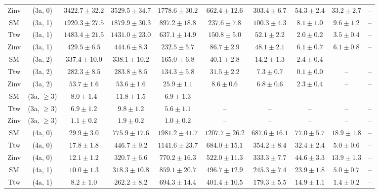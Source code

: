 \begin{table}[h!]
{\begin{tabular}{cccccccccc}
	Zinv & (3a, 0) & $3422.7\pm 32.2$ & $3529.5\pm 34.7$ & $1778.6\pm 30.2$ & $662.4\pm 12.6$ & $303.4\pm 6.7$ & $54.3\pm 2.4$ & $33.2\pm 2.7$ & -- \\[0.5ex] 
	SM & (3a, 1) & $1920.3\pm 27.5$ & $1879.9\pm 30.3$ & $897.2\pm 18.8$ & $237.6\pm 7.8$ & $100.3\pm 4.3$ & $8.1\pm 1.0$ & $9.6\pm 1.2$ & -- \\[0.5ex] 
	Ttw & (3a, 1) & $1483.4\pm 21.5$ & $1431.0\pm 23.0$ & $637.1\pm 14.9$ & $150.8\pm 5.0$ & $52.1\pm 2.2$ & $2.0\pm 0.2$ & $3.5\pm 0.4$ & -- \\[0.5ex] 
	Zinv & (3a, 1) & $429.5\pm 6.5$ & $444.6\pm 8.3$ & $232.5\pm 5.7$ & $86.7\pm 2.9$ & $48.1\pm 2.1$ & $6.1\pm 0.7$ & $6.1\pm 0.8$ & -- \\[0.5ex] 
	SM & (3a, 2) & $337.4\pm 10.0$ & $338.1\pm 10.2$ & $165.0\pm 6.8$ & $40.1\pm 2.8$ & $14.2\pm 1.3$ & $2.4\pm 0.4$ & -- & -- \\[0.5ex] 
	Ttw & (3a, 2) & $282.3\pm 8.5$ & $283.8\pm 8.5$ & $134.3\pm 5.8$ & $31.5\pm 2.2$ & $7.3\pm 0.7$ & $0.1\pm 0.0$ & -- & -- \\[0.5ex] 
	Zinv & (3a, 2) & $53.7\pm 1.6$ & $53.6\pm 1.6$ & $25.9\pm 1.1$ & $8.6\pm 0.6$ & $6.8\pm 0.6$ & $2.3\pm 0.4$ & -- & -- \\[0.5ex] 
	SM & (3a, $\ge3$) & $8.0\pm 1.4$ & $11.8\pm 1.5$ & $6.9\pm 1.3$ & -- & -- & -- & -- & -- \\[0.5ex] 
	Ttw & (3a, $\ge3$) & $6.9\pm 1.2$ & $9.8\pm 1.2$ & $5.6\pm 1.1$ & -- & -- & -- & -- & -- \\[0.5ex] 
	Zinv & (3a, $\ge3$) & $1.1\pm 0.2$ & $1.9\pm 0.2$ & $1.0\pm 0.2$ & -- & -- & -- & -- & -- \\[0.5ex] 
	SM & (4a, 0) & $29.9\pm 3.0$ & $775.9\pm 17.6$ & $1981.2\pm 41.7$ & $1207.7\pm 26.2$ & $687.6\pm 16.1$ & $77.0\pm 5.7$ & $18.9\pm 1.8$ & -- \\[0.5ex] 
	Ttw & (4a, 0) & $17.8\pm 1.8$ & $446.7\pm 9.2$ & $1141.6\pm 23.7$ & $684.0\pm 15.1$ & $354.2\pm 8.4$ & $32.4\pm 2.4$ & $5.0\pm 0.6$ & -- \\[0.5ex] 
	Zinv & (4a, 0) & $12.1\pm 1.2$ & $320.7\pm 6.6$ & $770.2\pm 16.3$ & $522.0\pm 11.3$ & $333.3\pm 7.7$ & $44.6\pm 3.3$ & $13.9\pm 1.3$ & -- \\[0.5ex] 
	SM & (4a, 1) & $10.0\pm 1.3$ & $318.3\pm 10.8$ & $859.1\pm 20.7$ & $496.7\pm 12.9$ & $245.3\pm 7.4$ & $23.9\pm 1.8$ & $5.0\pm 0.7$ & -- \\[0.5ex] 
	Ttw & (4a, 1) & $8.2\pm 1.0$ & $262.2\pm 8.2$ & $694.3\pm 14.4$ & $401.4\pm 10.5$ & $179.3\pm 5.5$ & $14.9\pm 1.1$ & $1.4\pm 0.2$ & -- \\[0.5ex] 

\end{tabular}}
\end{table}

